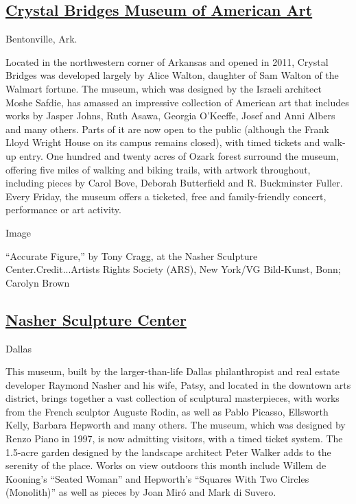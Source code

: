 \hypertarget{crystal-bridges-museum-of-american-art}{%
\subsection{\texorpdfstring{\href{https://crystalbridges.org/}{Crystal
Bridges Museum of American
Art}}{Crystal Bridges Museum of American Art}}\label{crystal-bridges-museum-of-american-art}}

Bentonville, Ark.

Located in the northwestern corner of Arkansas and opened in 2011,
Crystal Bridges was developed largely by Alice Walton, daughter of Sam
Walton of the Walmart fortune. The museum, which was designed by the
Israeli architect Moshe Safdie, has amassed an impressive collection of
American art that includes works by Jasper Johns, Ruth Asawa, Georgia
O'Keeffe, Josef and Anni Albers and many others. Parts of it are now
open to the public (although the Frank Lloyd Wright House on its campus
remains closed), with timed tickets and walk-up entry. One hundred and
twenty acres of Ozark forest surround the museum, offering five miles of
walking and biking trails, with artwork throughout, including pieces by
Carol Bove, Deborah Butterfield and R. Buckminster Fuller. Every Friday,
the museum offers a ticketed, free and family-friendly concert,
performance or art activity.

Image

``Accurate Figure,'' by Tony Cragg, at the Nasher Sculpture
Center.Credit...Artists Rights Society (ARS), New York/VG Bild-Kunst,
Bonn; Carolyn Brown

\hypertarget{nasher-sculpture-center}{%
\subsection{\texorpdfstring{\href{https://www.nashersculpturecenter.org/}{Nasher
Sculpture
Center}}{Nasher Sculpture Center}}\label{nasher-sculpture-center}}

Dallas

This museum, built by the larger-than-life Dallas philanthropist and
real estate developer Raymond Nasher and his wife, Patsy, and located in
the downtown arts district, brings together a vast collection of
sculptural masterpieces, with works from the French sculptor Auguste
Rodin, as well as Pablo Picasso, Ellsworth Kelly, Barbara Hepworth and
many others. The museum, which was designed by Renzo Piano in 1997, is
now admitting visitors, with a timed ticket system. The 1.5-acre garden
designed by the landscape architect Peter Walker adds to the serenity of
the place. Works on view outdoors this month include Willem de Kooning's
``Seated Woman'' and Hepworth's ``Squares With Two Circles (Monolith)''
as well as pieces by Joan Miró and Mark di Suvero.

